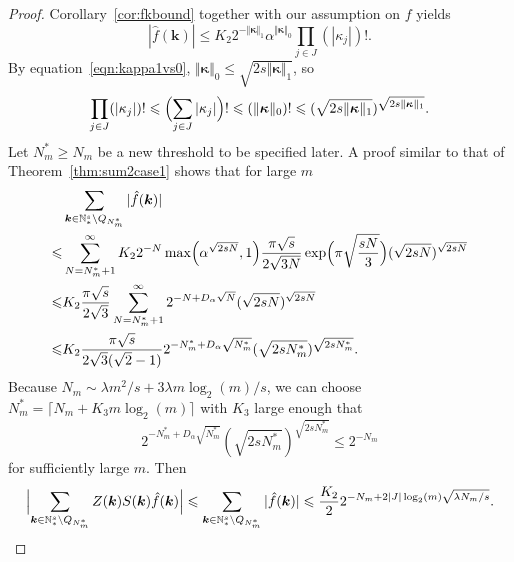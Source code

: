 \documentclass{article}
\theoremstyle{definition}
\renewcommand{\leq}{\leqslant}
\renewcommand{\geq}{\geqslant}
\newcommand{\natu}{\mathbb{N}}
\newcommand{\bsk}{\boldsymbol{k}}
\newcommand{\bskappa}{\boldsymbol{\kappa}}
\begin{document}
\begin{proof}
    Corollary~\ref{cor:fkbound} together with our assumption on $f$ yields
    \begin{equation}\label{eqn:fhatinsum2case2}
        |\hat{f}(\bsk)|\leq K_2 2^{-\Vert\bskappa\Vert_1}\alpha^{\Vert\bskappa\Vert_0}\prod_{j\in J} (|\kappa_j|)!.
    \end{equation}
    By equation~\eqref{eqn:kappa1vs0}, $\Vert\bskappa\Vert_0\leq \sqrt{2s \Vert\bskappa\Vert_1}$, so
    $$\prod_{j\in J} (|\kappa_j|)!\leq \Bigl(\sum_{j\in J}|\kappa_j|\Bigr)!\leq (\Vert\bskappa\Vert_0)!\leq (\sqrt{2s \Vert\bskappa\Vert_1})^{\sqrt{2s \Vert\bskappa\Vert_1}}.$$
    Let $N^*_m\geq N_m$ be a new threshold to be specified later. A proof similar to that of Theorem~\ref{thm:sum2case1} shows that  for large $m$
    \begin{align*}
    &\sum_{\bsk\in  \natu_*^s\setminus Q_{N^*_m}}|\hat{f}(\bsk)|\\
    \leq &\sum_{N=N^*_m+1}^\infty K_2 2^{-N}\max\Bigl(\alpha^{\sqrt{2s N}},1\Bigr)\frac{\pi\sqrt{s}}{2\sqrt{3N}}\exp\Bigl(\pi\sqrt{\frac{sN}{3}}\Bigr)(\sqrt{2s N})^{\sqrt{2s N}}\\
    \leq &K_2\frac{\pi\sqrt{s}}{2\sqrt{3}}\sum_{N=N^*_m+1}^\infty  2^{-N+D_\alpha\sqrt{N}} (\sqrt{2sN})^{\sqrt{2s N}}\\
    \leq & K_2\frac{ \pi\sqrt{s}}{2\sqrt{3}(\sqrt{2}-1)} 2^{-N^*_m+D_\alpha\sqrt{N^*_m}}(\sqrt{2sN^*_m})^{\sqrt{2s N^*_m}}.
\end{align*}
Because $N_m\sim \lambda m^2/s+3\lambda m\log_2(m)/s$, we can choose $N^*_m=\lceil N_m+K_3m\log_2(m)\rceil$ with $K_3$ large enough that
$$2^{-N^*_m+D_\alpha\sqrt{N^*_m}}(\sqrt{2sN^*_m})^{\sqrt{2s N^*_m}}\leq 2^{-N_m}$$
for sufficiently large $m$. Then
$$ \Bigl|\sum_{\bsk\in \natu_*^s\setminus Q_{N^*_m} } Z(\bsk)S(\bsk)\hat{f}(\bsk)\Bigr|\leq \sum_{\bsk\in  \natu_*^s\setminus Q_{N^*_m}}|\hat{f}(\bsk)|\leq \frac{K_2}{2}2^{-N_m+2|J|\log_2(m)\sqrt{\lambda N_m/s }}.$$


\end{proof}
\end{document}
